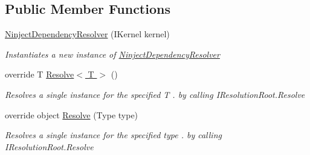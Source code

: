\subsection*{Public Member Functions}
\begin{DoxyCompactItemize}
\item 
\hyperlink{classCqrs_1_1Ninject_1_1Configuration_1_1NinjectDependencyResolver_a4fcafd900ce217f2da9c703a0c2413f8_a4fcafd900ce217f2da9c703a0c2413f8}{Ninject\+Dependency\+Resolver} (I\+Kernel kernel)
\begin{DoxyCompactList}\small\item\em Instantiates a new instance of \hyperlink{classCqrs_1_1Ninject_1_1Configuration_1_1NinjectDependencyResolver}{Ninject\+Dependency\+Resolver} \end{DoxyCompactList}\item 
override T \hyperlink{classCqrs_1_1Ninject_1_1Configuration_1_1NinjectDependencyResolver_ab044ba98051bdd3111e0c1be6259de10_ab044ba98051bdd3111e0c1be6259de10}{Resolve$<$ T $>$} ()
\begin{DoxyCompactList}\small\item\em Resolves a single instance for the specified {\itshape T} . by calling I\+Resolution\+Root.\+Resolve \end{DoxyCompactList}\item 
override object \hyperlink{classCqrs_1_1Ninject_1_1Configuration_1_1NinjectDependencyResolver_ab9da7f1556cc1ef205d03d3ff62017c0_ab9da7f1556cc1ef205d03d3ff62017c0}{Resolve} (Type type)
\begin{DoxyCompactList}\small\item\em Resolves a single instance for the specified {\itshape type} . by calling I\+Resolution\+Root.\+Resolve \end{DoxyCompactList}\end{DoxyCompactItemize}
